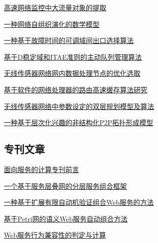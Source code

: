 \documentclass[a4paper]{article}
\begin{document}
\href{http://www.jos.org.cn/ch/reader/download_pdf.aspx?file_no=20071209&year_id=2007&quarter_id=12&falg=1}{高速网络监控中大流量对象的提取}

\href{http://www.jos.org.cn/ch/reader/download_pdf.aspx?file_no=20071210&year_id=2007&quarter_id=12&falg=1}{一种网络自组织演化的数学模型}

\href{http://www.jos.org.cn/ch/reader/download_pdf.aspx?file_no=20071211&year_id=2007&quarter_id=12&falg=1}{一种基于故障时间的可调域间出口选择算法}

\href{http://www.jos.org.cn/ch/reader/download_pdf.aspx?file_no=20071212&year_id=2007&quarter_id=12&falg=1}{基于D稳定域和ITAE准则的主动队列管理算法}

\href{http://www.jos.org.cn/ch/reader/download_pdf.aspx?file_no=20071213&year_id=2007&quarter_id=12&falg=1}{无线传感器网络网内数据处理节点的优化选取}

\href{http://www.jos.org.cn/ch/reader/download_pdf.aspx?file_no=20071214&year_id=2007&quarter_id=12&falg=1}{基于软件的网络处理器的路由高速缓存算法研究}

\href{http://www.jos.org.cn/ch/reader/download_pdf.aspx?file_no=20071215&year_id=2007&quarter_id=12&falg=1}{无线传感器网络中参数设定的双层规划模型及算法}

\href{http://www.jos.org.cn/ch/reader/download_pdf.aspx?file_no=20071216&year_id=2007&quarter_id=12&falg=1}{一种基于层次化兴趣的非结构化P2P拓扑形成模型}

\subsection{专刊文章}
\href{http://www.jos.org.cn/ch/reader/download_pdf.aspx?file_no=20071201&year_id=2007&quarter_id=12&falg=1}{面向服务的计算专刊前言}

\href{http://www.jos.org.cn/ch/reader/download_pdf.aspx?file_no=20071202&year_id=2007&quarter_id=12&falg=1}{一个基于服务层叠网的分层服务组合框架}

\href{http://www.jos.org.cn/ch/reader/download_pdf.aspx?file_no=20071203&year_id=2007&quarter_id=12&falg=1}{一种基于扩展有限自动机验证组合Web服务的方法}

\href{http://www.jos.org.cn/ch/reader/download_pdf.aspx?file_no=20071204&year_id=2007&quarter_id=12&falg=1}{基于Petri网的语义Web服务自动组合方法}

\href{http://www.jos.org.cn/ch/reader/download_pdf.aspx?file_no=20071205&year_id=2007&quarter_id=12&falg=1}{Web服务行为兼容性的判定与计算}
\end{document}
